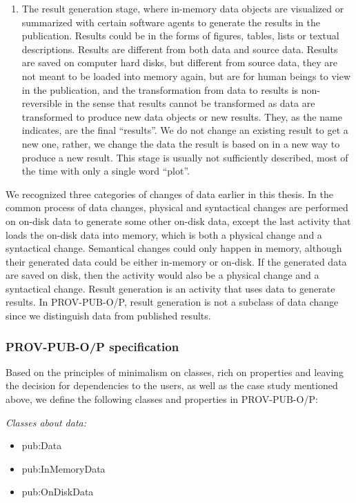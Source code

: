 \begin{enumerate}
	\item The result generation stage, where in-memory data objects are visualized or summarized with certain software agents to generate the results in the publication. Results could be in the forms of figures, tables, lists or textual descriptions. Results are different from both data and source data. Results are saved on computer hard disks, but different from source data, they are not meant to be loaded into memory again, but are for human beings to view in the publication, and the transformation from data to results is non-reversible in the sense that results cannot be transformed as data are transformed to produce new data objects or new results. They, as the name indicates, are the final ``results''. We do not change an existing result to get a new one, rather, we change the data the result is based on in a new way to produce a new result. This stage is usually not sufficiently described, most of the time with only a single word ``plot''.
\end{enumerate}
We recognized three categories of changes of data earlier in this thesis. In the common process of data changes, physical and syntactical changes are performed on on-disk data to generate some other on-disk data, except the last activity that loads the on-disk data into memory, which is both a physical change and a syntactical change. Semantical changes could only happen in memory, although their generated data could be either in-memory or on-disk. If the generated data are saved on disk, then the activity would also be a physical change and a syntactical change. Result generation is an activity that uses data to generate results. In PROV-PUB-O/P, result generation is not a subclass of data change since we distinguish data from published results.

\subsubsection{PROV-PUB-O/P specification}
Based on the principles of minimalism on classes, rich on properties and leaving the decision for dependencies to the users, as well as the case study mentioned above, we define the following classes and properties in PROV-PUB-O/P:

\hspace{-1em}\emph{Classes about data:}
\begin{itemize}
	\item pub:Data
	\item pub:InMemoryData
	\item pub:OnDiskData
\end{itemize}

